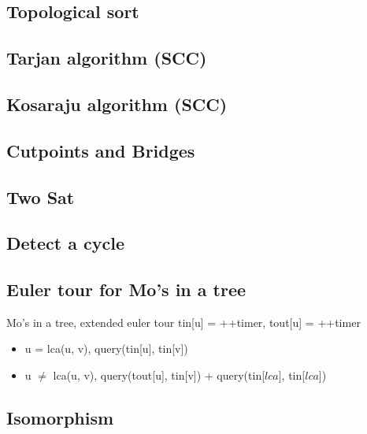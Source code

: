 
\subsection{Topological sort}

\subsection{Tarjan algorithm (SCC)}

\subsection{Kosaraju algorithm (SCC)}

\subsection{Cutpoints and Bridges}


\subsection{Two Sat}

\subsection{Detect a cycle}

\subsection{Euler tour for Mo's in a tree}
\vspace{-5pt}
Mo's in a tree, extended euler tour \small{tin[u] = ++timer, tout[u] = ++timer} 
\vspace{-5pt}
\begin{itemize}[noitemsep]
  \item u = lca(u, v), query(tin[u], tin[v]) 
  \item u $\neq$ lca(u, v), query(tout[u], tin[v]) + query(tin[$lca$], tin[$lca$])
\end{itemize}
\vspace{-10pt}

\subsection{Isomorphism}

